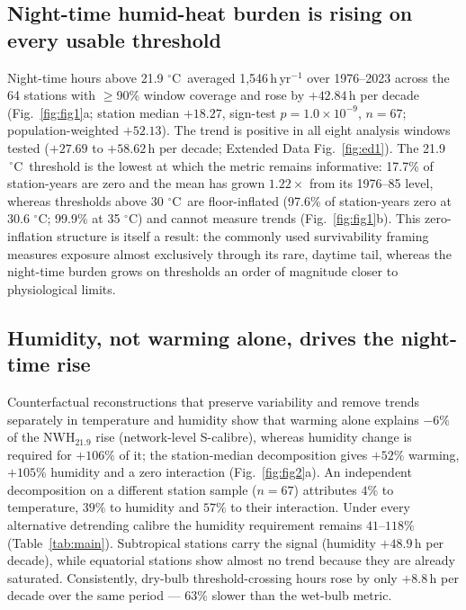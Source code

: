\documentclass[12pt,a4paper]{article}
\newcommand{\dd}{\ensuremath{\,^{\circ}\mathrm{C}}}
\begin{document}
\subsection*{Night-time humid-heat burden is rising on every usable threshold}
Night-time hours above 21.9\,\dd~averaged 1,546\,h\,yr$^{-1}$ over 1976--2023 across the 64 stations
with $\geq$90\% window coverage and rose by $+42.84$\,h per decade (Fig.~\ref{fig:fig1}a; station
median $+18.27$, sign-test $p=1.0\times10^{-9}$, $n=67$; population-weighted $+52.13$). The trend is
positive in all eight analysis windows tested ($+27.69$ to $+58.62$\,h per decade; Extended Data
Fig.~\ref{fig:ed1}). The 21.9\,\dd~threshold is the lowest at which the metric remains informative:
17.7\% of station-years are zero and the mean has grown $1.22\times$ from its 1976--85 level, whereas
thresholds above 30\,\dd~are floor-inflated (97.6\% of station-years zero at 30.6\,\dd; 99.9\% at
35\,\dd) and cannot measure trends (Fig.~\ref{fig:fig1}b). This zero-inflation structure is itself a
result: the commonly used survivability framing measures exposure almost exclusively through its
rare, daytime tail\citep{Vecellio2023}, whereas the night-time burden grows on thresholds an
order of magnitude closer
to physiological limits.

\subsection*{Humidity, not warming alone, drives the night-time rise}
Counterfactual reconstructions that preserve variability and remove trends separately in temperature
and humidity show that warming alone explains $-6\%$ of the $\mathrm{NWH}_{21.9}$ rise (network-level
S-calibre), whereas humidity change is required for $+106\%$ of it; the station-median decomposition
gives $+52\%$ warming, $+105\%$ humidity and a zero interaction (Fig.~\ref{fig:fig2}a). An
independent decomposition on a different station sample ($n=67$) attributes $4\%$ to temperature,
$39\%$ to humidity and $57\%$ to their interaction. Under every alternative detrending calibre the
humidity requirement remains $41$--$118\%$ (Table~\ref{tab:main}). Subtropical stations carry the
signal (humidity $+48.9$\,h per decade), while equatorial stations show almost no trend because they
are already saturated. Consistently, dry-bulb threshold-crossing hours rose by only $+8.8$\,h per
decade over the same period --- $63\%$ slower than the wet-bulb metric.
\end{document}
